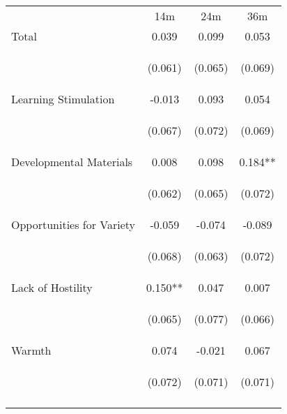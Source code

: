 \begin{tabular}{lccc}
\hline \noalign{\smallskip} & 14m & 24m & 36m\\
\noalign{\smallskip}\hline \noalign{\smallskip}Total & 0.039 & 0.099 & 0.053\\
 & \begin{footnotesize}(0.061)\end{footnotesize} & \begin{footnotesize}(0.065)\end{footnotesize} & \begin{footnotesize}(0.069)\end{footnotesize}\\
\noalign{\smallskip}Learning Stimulation & -0.013 & 0.093 & 0.054\\
 & \begin{footnotesize}(0.067)\end{footnotesize} & \begin{footnotesize}(0.072)\end{footnotesize} & \begin{footnotesize}(0.069)\end{footnotesize}\\
\noalign{\smallskip}Developmental Materials & 0.008 & 0.098 & 0.184**\\
 & \begin{footnotesize}(0.062)\end{footnotesize} & \begin{footnotesize}(0.065)\end{footnotesize} & \begin{footnotesize}(0.072)\end{footnotesize}\\
\noalign{\smallskip}Opportunities for Variety & -0.059 & -0.074 & -0.089\\
 & \begin{footnotesize}(0.068)\end{footnotesize} & \begin{footnotesize}(0.063)\end{footnotesize} & \begin{footnotesize}(0.072)\end{footnotesize}\\
\noalign{\smallskip}Lack of Hostility & 0.150** & 0.047 & 0.007\\
 & \begin{footnotesize}(0.065)\end{footnotesize} & \begin{footnotesize}(0.077)\end{footnotesize} & \begin{footnotesize}(0.066)\end{footnotesize}\\
\noalign{\smallskip}Warmth & 0.074 & -0.021 & 0.067\\
 & \begin{footnotesize}(0.072)\end{footnotesize} & \begin{footnotesize}(0.071)\end{footnotesize} & \begin{footnotesize}(0.071)\end{footnotesize}\\
\noalign{\smallskip}\hline\end{tabular}\\
